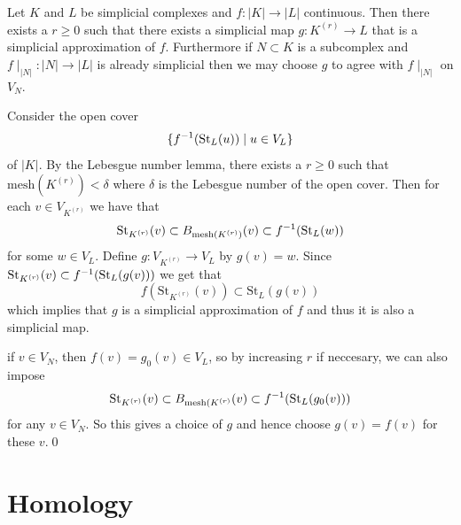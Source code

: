 \documentclass{article}
\begin{document}
\begin{theorem}
	Let $ K $ and $ L $ be simplicial complexes and $ f: |K| \to |L| $ continuous. Then there exists a $ r\ge 0 $ such that there exists a simplicial map $ g:K^{(r)} \to L $ that is a simplicial approximation of $ f $. Furthermore if $ N\subset K $ is a subcomplex and $ f\mid_{|N|}: |N|\to |L| $ is already simplicial then we may choose $ g $ to agree with $ f\mid_{|N|} $ on $ V_N $.
\end{theorem}
\pf Consider the open cover 
\[
	\{ {f}^{-1} (\mathrm{St}_L(u)) \mid u\in V_L\}
\]
of $ |K| $. By the Lebesgue number lemma, there exists a $ r\ge 0 $ such that $ \mathrm{mesh}(K^{(r)}) < \delta $ where $ \delta $ is the Lebesgue number of the open cover. Then for each $ v\in V_{K^{(r)}} $ we have that
\[
	\mathrm{St}_{K^{(r)}}(v)\subset B_{\mathrm{mesh}(K^{(r)})}(v)\subset {f}^{-1}(\mathrm{St}_L(w))
\]
for some $ w\in V_L $. Define $ g : V_{K^{(r)}} \to V_L	$ by $ g(v) = w $. Since $ \mathrm{St}_{K^{(r)}}(v) \subset {f}^{-1}(\mathrm{St}_L(g(v))) $ we get that 
\[
f(\mathrm{St}_{K^{(r)}}(v))\subset \mathrm{St}_L(g(v))
\]
which implies that $ g $ is a simplicial approximation of $ f $ and thus it is also a simplicial map.\par
if $ v\in V_N $, then $ f(v) = g_0(v)\in V_L $, so by increasing $ r $ if neccesary, we can also impose 
\[
	\mathrm{St}_{K^{(r)}}(v) \subset B_{\mathrm{mesh}(K^{(r)}}(v)\subset {f}^{-1}(\mathrm{St}_L(g_0(v)))
\]
for any $ v\in V_N $. So this gives a choice of $ g $ and hence choose $ g(v) = f(v) $ for these $ v $.\qed
\section{Homology}
\end{document}
